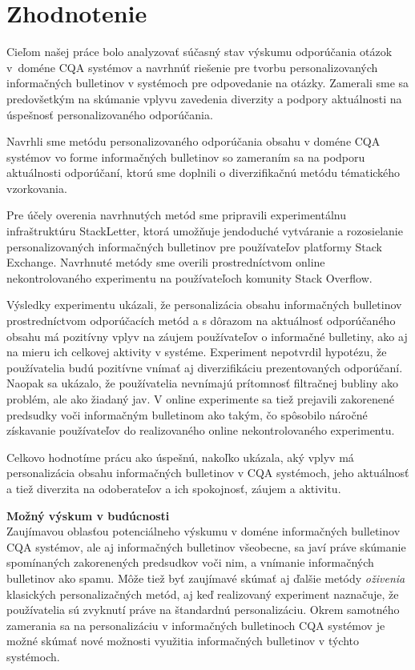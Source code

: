 \afterpage{\blankpage}
\newpage
\chapter{Zhodnotenie}

Cieľom našej práce bolo analyzovať súčasný stav výskumu odporúčania otázok v~doméne CQA systémov a navrhnúť riešenie pre
tvorbu personalizovaných informačných bulletinov v systémoch pre odpovedanie na otázky. Zamerali sme sa predovšetkým na
skúmanie vplyvu zavedenia diverzity a podpory aktuálnosti na úspešnosť personalizovaného odporúčania.

Navrhli sme metódu personalizovaného odporúčania obsahu v doméne CQA systémov vo forme informačných bulletinov so zameraním
sa na podporu aktuálnosti odporúčaní, ktorú sme doplnili o diverzifikačnú metódu tématického vzorkovania.

Pre účely overenia navrhnutých metód sme pripravili experimentálnu infraštruktúru StackLetter, ktorá umožňuje jendoduché
vytváranie a rozosielanie personalizovaných informačných bulletinov pre používateľov platformy Stack Exchange.
Navrhnuté metódy sme overili prostredníctvom online nekontrolovaného experimentu na používateľoch komunity Stack Overflow.

Výsledky experimentu ukázali, že personalizácia obsahu informačných bulletinov prostredníctvom odporúčacích metód
a s dôrazom na aktuálnosť odporúčaného obsahu má pozitívny vplyv na záujem používateľov o informačné bulletiny, ako
aj na mieru ich celkovej aktivity v systéme. Experiment nepotvrdil hypotézu, že používatelia budú pozitívne vnímať
aj diverzifikáciu prezentovaných odporúčaní. Naopak sa ukázalo, že používatelia nevnímajú prítomnosť filtračnej bubliny
ako problém, ale ako žiadaný jav.
V online experimente sa tiež prejavili zakorenené predsudky voči informačným bulletinom ako takým, čo spôsobilo náročné
získavanie používateľov do realizovaného online nekontrolovaného experimentu.

Celkovo hodnotíme prácu ako úspešnú, nakoľko ukázala, aký vplyv má personalizácia obsahu informačných bulletinov v CQA systémoch,
jeho aktuálnosť a tiež diverzita na odoberateľov a ich spokojnosť, záujem a aktivitu.


\textbf{Možný výskum v budúcnosti}\\
Zaujímavou oblasťou potenciálneho výskumu v doméne informačných bulletinov CQA systémov, ale aj informačných bulletinov
všeobecne, sa javí práve skúmanie spomínaných zakorenených predsudkov voči nim, a vnímanie informačných bulletinov ako spamu.
Môže tiež byť zaujímavé skúmať aj ďalšie metódy \textit{oživenia} klasických personalizačných metód,
aj keď realizovaný experiment naznačuje, že používatelia sú zvyknutí práve na štandardnú personalizáciu.
Okrem samotného zamerania sa na personalizáciu v informačných bulletinoch CQA systémov je možné skúmať nové možnosti využitia
informačných bulletinov v týchto systémoch.
